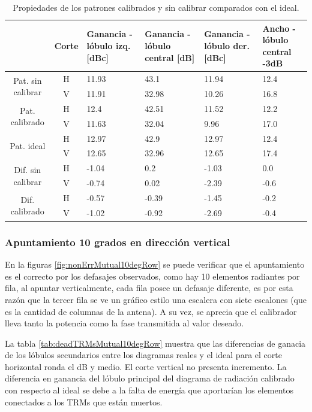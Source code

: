 \begin{table}[H]
  \footnotesize
  \centering
  \begin{tabular}{|c|c|p{2cm}|p{2.5cm}|p{2.5cm}|p{2.5cm}|}
    \cline{2-6}
    \multicolumn{1}{c|}{} & Corte & Ganancia - lóbulo izq. [dBc] & Ganancia - lóbulo central [dB] &
    Ganancia - lóbulo der. [dBc] & Ancho - lóbulo central -3dB \tabularnewline\hline
    \multirow{2}{2cm}{Pat. sin calibrar} & H & 11.93 & 43.1 & 11.94 & 12.4 \tabularnewline\cline{2-6}
     & V & 11.91 & 32.98 & 10.26 & 16.8 \tabularnewline\hline
    \multirow{2}{2cm}{Pat. calibrado} & H & 12.4 & 42.51 & 11.52 & 12.2 \tabularnewline\cline{2-6}
     & V & 11.63 & 32.04 & 9.96 & 17.0 \tabularnewline\hline
    \multirow{2}{2cm}{Pat. ideal} & H & 12.97 & 42.9 & 12.97 & 12.4 \tabularnewline\cline{2-6}
     & V & 12.65 & 32.96 & 12.65 & 17.4 \tabularnewline\hline
    \multirow{2}{2cm}{Dif. sin calibrar} & H & -1.04 & 0.2 & -1.03 & 0.0\tabularnewline\cline{2-6}
     & V & -0.74 & 0.02 & -2.39 & -0.6 \tabularnewline\hline
    \multirow{2}{2cm}{Dif. calibrado} & H & -0.57 & -0.39 & -1.45 & -0.2 \tabularnewline\cline{2-6}
     & V & -1.02 & -0.92 & -2.69 & -0.4 \tabularnewline\hline
  \end{tabular}
  \caption{Propiedades de los patrones calibrados y sin calibrar comparados con el ideal.}
  \label{tab:deadTRMsMutual10degCol}
\end{table}


\subsubsection{Apuntamiento 10 grados en dirección vertical}

En la figuras \ref{fig:nonErrMutual10degRow} se puede verificar que el apuntamiento es el correcto por los defasajes observados, 
como hay 10 elementos radiantes por fila, al apuntar verticalmente, cada fila posee un defasaje diferente, es por esta razón que 
la tercer fila se ve un gráfico estilo una escalera con siete escalones (que es la cantidad de columnas de la antena). A su vez, 
se aprecia que el calibrador lleva tanto la potencia como la fase transmitida al valor deseado.

La tabla \ref{tab:deadTRMsMutual10degRow} muestra que las diferencias de ganacia de los lóbulos secundarios entre los diagramas 
reales y el ideal para el corte horizontal ronda el dB y medio. El corte vertical no presenta incremento. La diferencia en 
ganancia del lóbulo principal del diagrama de radiación calibrado con respecto al ideal se debe a la falta de energía que 
aportarían los elementos conectados a los TRMs que están muertos.

